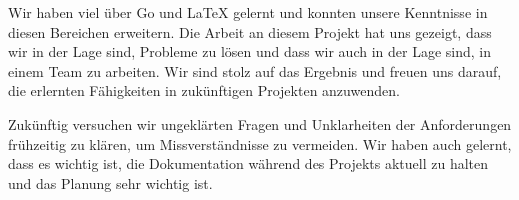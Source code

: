 Wir haben viel über Go und LaTeX gelernt und konnten unsere Kenntnisse in diesen Bereichen erweitern. Die Arbeit an diesem Projekt hat uns gezeigt, dass wir in der Lage sind, Probleme zu lösen und dass wir auch in der Lage sind, in einem Team zu arbeiten. Wir sind stolz auf das Ergebnis und freuen uns darauf, die erlernten Fähigkeiten in zukünftigen Projekten anzuwenden.
\newline

Zukünftig versuchen wir ungeklärten Fragen und Unklarheiten der Anforderungen frühzeitig zu klären, um Missverständnisse zu vermeiden. Wir haben auch gelernt, dass es wichtig ist, die Dokumentation während des Projekts aktuell zu halten und das Planung sehr wichtig ist.

\newpage